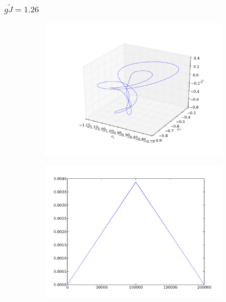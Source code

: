 \documentclass{beamer}
\begin{document}

\begin{frame}
\frametitle{$g\tilde{J} = 1.26$}
\begin{figure}
	\centering
	\begin{subfigure}[b]{0.49\textwidth}
		\includegraphics[width=\textwidth]{paulfigs/J_1_26_3d}
	\end{subfigure}
	\begin{subfigure}[b]{0.49\textwidth}
		\includegraphics[width=\textwidth]{paulfigs/tcorr_J_1_26}
	\end{subfigure}
\end{figure}
\end{frame}
\end{document}
